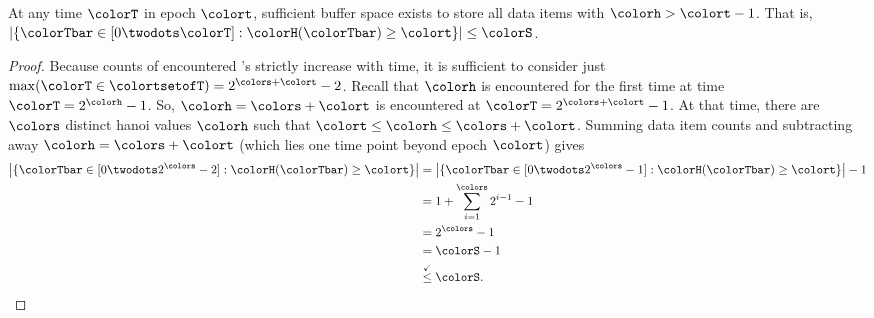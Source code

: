 \begin{lemma} \label{thm:steady-hv-geq-epoch}

At any time $\colorT$ in epoch $\colort$, sufficient buffer space exists to store all data items with \hv{} $\colorh > \colort - 1$.
That is, $\left| \{\colorTbar \in [0 \twodots \colorT] : \colorH(\colorTbar) \geq \colort \} \right| \leq \colorS$.
\end{lemma}

\begin{proof}
Because counts of encountered \hv{}'s strictly increase with time, it is sufficient to consider just $\max(\colorT \in \colortsetofT) = 2^{\colors + \colort} - 2$.
Recall that \hv{} $\colorh$ is encountered for the first time at time $\colorT = 2^{\colorh} - 1$.
So, \hv{} $\colorh = \colors + \colort$ is encountered at $\colorT = 2^{\colors + \colort} - 1$.
At that time, there are $\colors$ distinct hanoi values $\colorh$ such that $\colort \leq \colorh \leq \colors + \colort$.
Summing \hv{} data item counts and subtracting away $\colorh = \colors + \colort$ (which lies one time point beyond epoch $\colort$) gives
\begin{align*}
\left| \{\colorTbar \in [0 \twodots 2^{\colors} - 2] : \colorH(\colorTbar) \geq \colort \} \right|
&= \left| \{\colorTbar \in [0 \twodots 2^{\colors} - 1] : \colorH(\colorTbar) \geq \colort \} \right| - 1\\
&= 1 + \sum_{i=1}^{\colors} 2^{i - 1} - 1 \\
&= 2^{\colors} - 1 \\
&= \colorS - 1\\
&\stackrel{\checkmark}{\leq} \colorS.
\end{align*}
\end{proof}

